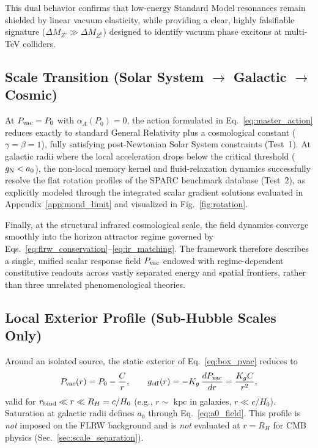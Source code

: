 \documentclass[prd,
               reprint,
               aps,
               preprintnumbers,
               nofootinbib,
               longbibliography,
               floatfix]{revtex4-2}
\begin{document}
This dual behavior confirms that low-energy Standard Model
resonances remain shielded by linear vacuum elasticity, while
providing a clear, highly falsifiable signature ($\Delta M_{Z'}
\gg \Delta M_{Z^0}$) designed to identify vacuum phase excitons
at multi-TeV colliders.

\subsection{Scale Transition (Solar System 
\texorpdfstring{$\to$}{->} Galactic \texorpdfstring{$\to$}{->} Cosmic)}
\label{sec:scale_transition}

At $P_{\rm vac}=P_0$ with $\alpha_A(P_0)=0$, the action
formulated in Eq.~\eqref{eq:master_action} reduces
exactly to standard General Relativity plus a cosmological
constant ($\gamma=\beta=1$), fully satisfying
post-Newtonian Solar System constraints (Test~1). At
galactic radii where the local acceleration drops below
the critical threshold ($g_{\rm N}<a_0$), the non-local
memory kernel and fluid-relaxation dynamics successfully
resolve the flat rotation profiles of the SPARC benchmark
database (Test~2), as explicitly modeled through the
integrated scalar gradient solutions evaluated in
Appendix~\ref{app:mond_limit} and visualized in
Fig.~\ref{fig:rotation}.

Finally, at the structural infrared cosmological scale,
the field dynamics converge smoothly into the horizon
attractor regime governed by
Eqs.~\eqref{eq:flrw_conservation}--\eqref{eq:ir_matching}.
The framework therefore describes a single, unified
scalar response field $P_{\rm vac}$ endowed with
regime-dependent constitutive readouts across vastly
separated energy and spatial frontiers, rather than
three unrelated phenomenological theories.
\subsection{Local Exterior Profile (Sub-Hubble Scales Only)}
\label{sec:local_exterior}

Around an isolated source, the static exterior of
Eq.~\eqref{eq:box_pvac} reduces to
\begin{equation}
\label{eq:Pvac_exterior}
P_{\rm vac}(r)=P_0-\frac{C}{r},
\qquad
g_{\rm eff}(r)=-K_g\,\frac{dP_{\rm vac}}{dr}
=\frac{K_g C}{r^2},
\end{equation}
valid for $r_{\rm bind}\ll r\ll R_H=c/H_0$ (e.g., $r\sim$ kpc
in galaxies, $r\ll c/H_0$).
Saturation at galactic radii defines $a_0$ through
Eq.~\eqref{eq:a0_field}.
This profile is \emph{not} imposed on the FLRW
background and is \emph{not} evaluated at $r=R_H$
for CMB physics (Sec.~\ref{sec:scale_separation}).
\end{document}
